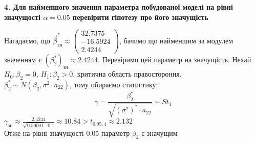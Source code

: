 \documentclass[12 pt]{article}
\begin{document}
 \begin{center}
    \textbf{ 4. Для найменшого значення параметра побудованої моделі на рівні значущості $\alpha=0.05$ перевірити гіпотезу про його значущість}
\end{center}
Нагадаємо, що 
$
\vec{\beta}^*_{\text{зн}} \approx 
\begin{pmatrix}
    32.7375 \\ 
    -16.5924 \\ 
    2.4244 
\end{pmatrix}
$, бачимо що найменшим за модулем значенням є $(\beta^*_2)_\text{зн} \approx 2.4244$. 
Перевіримо цей параметр на значущість. Нехай $H_0 : \beta_2 = 0$, 
$H_1 : \beta_2 > 0$, критична область правостороння. \\ 
$\beta_2^* \sim N(\beta_2 , \sigma^2 \cdot a_{22})$, тому обираємо статистику:
$$
\gamma = \frac{\beta^*_2}{ \sqrt{(\sigma^2)^* \cdot a_{22}} } \sim St_{4}
$$
$\gamma_{\text{зн}} \approx \frac{2.4244}{ \sqrt{0.50001} \cdot 0.1 } 
\approx 10.84 > t_{0.05, 4} \approx 2.132$\\ 
Отже на рівні значущості 0.05 параметр $\beta_2 $ є значущим
\end{document}
